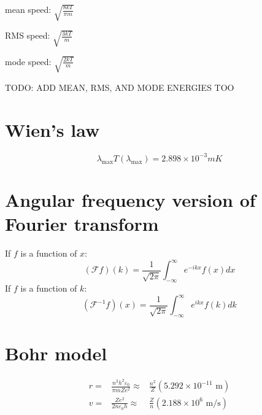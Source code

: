 \documentclass[12pt]{article}
\begin{document}
mean speed: $\sqrt{ \frac{8kT}{\pi m} }$

RMS speed: $\sqrt{ \frac{3kT}{m} }$

mode speed: $\sqrt{ \frac{2kT}{m} }$

TODO: ADD MEAN, RMS, AND MODE ENERGIES TOO

\section{Wien's law}
\[ \lambda_\text{max} T(\lambda_\text{max}) = 2.898 \times 10^{-3} mK \]

\section{Angular frequency version of Fourier transform}
If $f$ is a function of $x$:
\[ (\mathcal{F}f)(k) = \frac{1}{\sqrt{2 \pi}} \int_{-\infty}^\infty e^{-ikx}f(x) dx \]
If $f$ is a function of $k$:
\[ (\mathcal{F}^{-1}f)(x) = \frac{1}{\sqrt{2 \pi}} \int_{-\infty}^\infty e^{ikx}f(k) dk \]

\section{Bohr model}
\begin{align*}
    r =& \frac{n^2 h^2 \varepsilon_0}{\pi m Z e^2} \approx& \frac{n^2}{Z}  (5.292\times 10^{-11} \text{ m}) \\
    v =& \frac{Z e^2}{2 n \varepsilon_0 h} \approx& \frac{Z}{n} (2.188\times 10^{6} \text{ m/s})
\end{align*}
\end{document}
